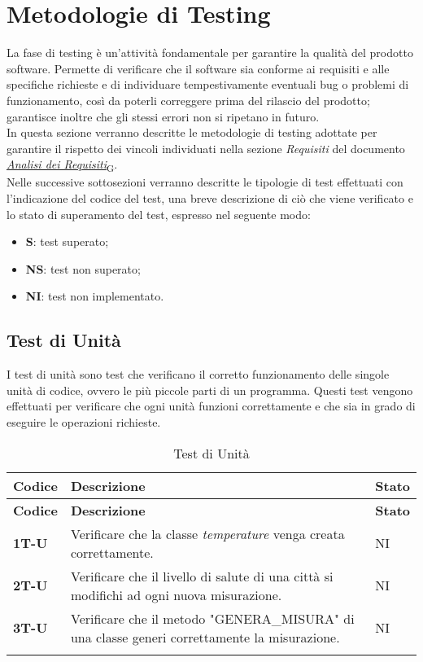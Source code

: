 \section{Metodologie di Testing}
La fase di testing è un'attività fondamentale per garantire la qualità del prodotto software. Permette di verificare che il software sia conforme ai requisiti e alle specifiche richieste e di individuare tempestivamente eventuali bug o problemi di funzionamento, così da poterli correggere prima del rilascio del prodotto; garantisce inoltre che gli stessi errori non si ripetano in futuro. \\
In questa sezione verranno descritte le metodologie di testing adottate per garantire il rispetto dei vincoli individuati nella sezione \textit{Requisiti} del documento \href{https://7last.github.io/docs/rtb/documentazione-esterna/analisi-dei-requisiti}{\href{https://7last.github.io/docs/rtb/documentazione-interna/glossario\#analisi-dei-requisiti}{\textit{Analisi dei Requisiti}\textsubscript{G}}}. \\ %
Nelle successive sottosezioni verranno descritte le tipologie di test effettuati con l'indicazione del codice del test, una breve descrizione di ciò che viene verificato e lo stato di superamento del test, espresso nel seguente modo: \\
\begin{itemize}
    \item \textbf{S}: test superato;
    \item \textbf{NS}: test non superato;
    \item \textbf{NI}: test non implementato.
\end{itemize}

\subsection{Test di Unità}
I test di unità sono test che verificano il corretto funzionamento delle singole unità di codice, ovvero le più piccole parti di un programma. Questi test vengono effettuati per verificare che ogni unità funzioni correttamente e che sia in grado di eseguire le operazioni richieste. \\
\begin{longtable}{|>{\raggedright\arraybackslash}m{}|>{\raggedright\arraybackslash}m{}|>{\raggedright\arraybackslash}m{}|}
	\hline
	\textbf{Codice} & \textbf{Descrizione} & \textbf{Stato} \\
	\hline
	\endfirsthead
	\hline
	\textbf{Codice} & \textbf{Descrizione} & \textbf{Stato} \\
	\endhead
	\textbf{1T-U}   & Verificare che la classe \textit{temperature} venga creata correttamente. & NI\\
	\hline
	\textbf{2T-U}   & Verificare che il livello di salute di una città si modifichi ad ogni nuova misurazione. & NI\\
	\hline
	\textbf{3T-U}   & Verificare che il metodo "GENERA\_MISURA" di una classe generi correttamente la misurazione. & NI\\
	\hline
	\caption{Test di Unità}
	\label{table:12}
\end{longtable}

